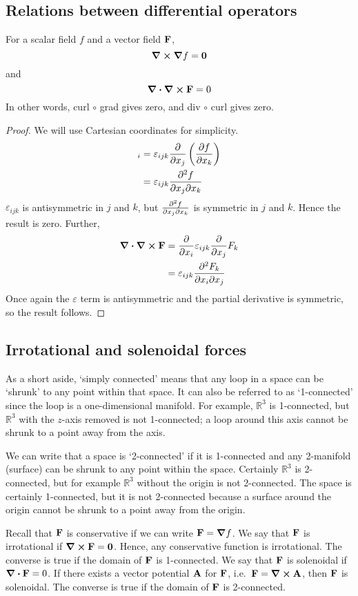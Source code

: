 \subsection{Relations between differential operators}
\begin{proposition}
	For a scalar field \(f\) and a vector field \(\vb F\),
	\[
		\curl{\grad{f}} = \vb 0
	\]
	and
	\[
		\div{\curl{\vb F}} = 0
	\]
	In other words, curl \(\circ\) grad gives zero, and div \(\circ\) curl gives zero.
\end{proposition}
\begin{proof}
	We will use Cartesian coordinates for simplicity.
	\begin{align*}
		[\curl{\grad{f}}]_i & = \varepsilon_{ijk} \pdv{x_j} \left( \pdv{f}{x_k} \right) \\
		                    & = \varepsilon_{ijk} \pdv{f}{x_j}{x_k}
	\end{align*}
	\(\varepsilon_{ijk}\) is antisymmetric in \(j\) and \(k\), but \(\pdv{f}{x_j}{x_k}\) is symmetric in \(j\) and \(k\).
	Hence the result is zero.
	Further,
	\begin{align*}
		\div{\curl{\vb F}} & = \pdv{x_i} \varepsilon_{ijk} \pdv{x_j} F_k \\
		                   & = \varepsilon_{ijk} \pdv{F_k}{x_i}{x_j}
	\end{align*}
	Once again the \(\varepsilon\) term is antisymmetric and the partial derivative is symmetric, so the result follows.
\end{proof}

\subsection{Irrotational and solenoidal forces}
As a short aside, `simply connected' means that any loop in a space can be `shrunk' to any point within that space.
It can also be referred to as `1-connected' since the loop is a one-dimensional manifold.
For example, \(\mathbb R^3\) is 1-connected, but \(\mathbb R^3\) with the \(z\)-axis removed is not 1-connected; a loop around this axis cannot be shrunk to a point away from the axis.

We can write that a space is `2-connected' if it is 1-connected and any 2-manifold (surface) can be shrunk to any point within the space.
Certainly \(\mathbb R^3\) is 2-connected, but for example \(\mathbb R^3\) without the origin is not 2-connected.
The space is certainly 1-connected, but it is not 2-connected because a surface around the origin cannot be shrunk to a point away from the origin.

Recall that \(\vb F\) is conservative if we can write \(\vb F = \grad f\).
We say that \(\vb F\) is irrotational if \(\curl{\vb F} = \vb 0\).
Hence, any conservative function is irrotational.
The converse is true if the domain of \(\vb F\) is 1-connected.
We say that \(\vb F\) is solenoidal if \(\div{\vb F} = 0\).
If there exists a vector potential \(\vb A\) for \(\vb F\), i.e.\ \(\vb F = \curl{\vb A}\), then \(\vb F\) is solenoidal.
The converse is true if the domain of \(\vb F\) is 2-connected.
